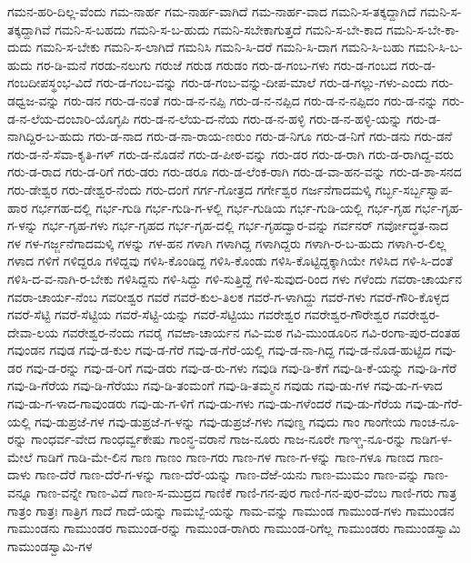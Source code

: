 ಗಮನ-ಹರಿ-ದಿಲ್ಲ-ವೆಂದು
ಗಮ-ನಾರ್ಹ
ಗಮ-ನಾರ್ಹ-ವಾಗಿದೆ
ಗಮ-ನಾರ್ಹ-ವಾದ
ಗಮನಿ-ಸ-ತಕ್ಕದ್ದಾಗಿದೆ
ಗಮನಿ-ಸ-ತಕ್ಕದ್ದಾಗಿವೆ
ಗಮನಿ-ಸ-ಬಹದು
ಗಮನಿ-ಸ-ಬ-ಹುದು
ಗಮನಿ-ಸಬೇಕಾಗುತ್ತದೆ
ಗಮನಿ-ಸ-ಬೇ-ಕಾದ
ಗಮನಿ-ಸ-ಬೇ-ಕಾ-ದುದು
ಗಮನಿ-ಸ-ಬೇಕು
ಗಮನಿ-ಸ-ಲಾಗಿದೆ
ಗಮನಿಸಿ
ಗಮನಿ-ಸಿ-ದರೆ
ಗಮನಿ-ಸಿ-ದಾಗ
ಗಮನಿ-ಸಿ-ಬಹು
ಗಮನಿ-ಸಿ-ಬ-ಹುದು
ಗರ-ಡಿ-ಮನೆ
ಗರಡು-ನಲುಗು
ಗರುಜೆ
ಗರುಡ
ಗರುಡಂ
ಗರು-ಡ-ಗಂಬ-ಗಳು
ಗರು-ಡ-ಗಂಬದ
ಗರು-ಡ-ಗಂಬದೀಪಸ್ಥಂಭ-ವಿದೆ
ಗರು-ಡ-ಗಂಬ-ವನ್ನು
ಗರು-ಡ-ಗಂಬ-ವನ್ನು-ದೀಪ-ಮಾಲೆ
ಗರು-ಡ-ಗಲ್ಲು-ಗಳು-ಎಂದು
ಗರು-ಡಧ್ವಜ-ವನ್ನು
ಗರು-ಡನ
ಗರು-ಡ-ನಂತೆ
ಗರು-ಡ-ನ-ನಪ್ಪಿ
ಗರು-ಡ-ನ-ನಪ್ಪಿದ
ಗರು-ಡ-ನ-ನಪ್ಪಿದಂ
ಗರು-ಡ-ನನ್ನು
ಗರು-ಡ-ನ-ಲೆಯ-ದಂಬಾರಿ-ಯೊಗ್ಳಪಿ
ಗರು-ಡ-ನ-ಲೆಯ-ದ-ನೆಯ
ಗರು-ಡ-ನ-ಹಳ್ಳಿ
ಗರು-ಡ-ನ-ಹಳ್ಳಿ-ಯನ್ನು
ಗರು-ಡ-ನಾಗಿದ್ದಿರ-ಬ-ಹುದು
ಗರು-ಡ-ನಾದ
ಗರು-ಡ-ನಾ-ರಾಯ-ಣರುಂ
ಗರು-ಡ-ನಿಗೂ
ಗರು-ಡ-ನಿಗೆ
ಗರು-ಡನು
ಗರು-ಡನೆ
ಗರು-ಡ-ನೆ-ಸೆವಾ-ಕೃತಿ-ಗಳ್
ಗರು-ಡ-ನೊಡನೆ
ಗರು-ಡ-ಪೀಠ-ವನ್ನು
ಗರು-ಡರ
ಗರು-ಡ-ರಾಗಿ
ಗರು-ಡ-ರಾಗಿದ್ದ-ವರು
ಗರು-ಡ-ರಾದ
ಗರು-ಡ-ರಿಗೆ
ಗರು-ಡರು
ಗರು-ಡರೂ
ಗರು-ಡ-ಲೆಂಕ-ರಾಗಿ
ಗರು-ಡ-ವಾ-ಹನ-ವನ್ನು
ಗರು-ಡ-ಶಾ-ಸನದ
ಗರು-ಡೇಶ್ವರ
ಗರು-ಡೇಶ್ವರ-ನೆಂದು
ಗರು-ದಂಗೆ
ಗರ್ಗ-ಗೋತ್ರದ
ಗರ್ಗೇಶ್ವರ
ಗರ್ಜನೆಗಾದಮಳ್ಕಿ
ಗರ್ಬ್ಭ-ಸರ್ಬ್ಬಸ್ವಾಪ-ಹಾರ
ಗರ್ಭಗಹ-ದಲ್ಲಿ
ಗರ್ಭ-ಗುಡಿ
ಗರ್ಭ-ಗುಡಿ-ಗ-ಳಲ್ಲಿ
ಗರ್ಭ-ಗುಡಿಯ
ಗರ್ಭ-ಗುಡಿ-ಯಲ್ಲಿ
ಗರ್ಭ-ಗೃಹ
ಗರ್ಭ-ಗೃಹ-ಗ-ಳನ್ನು
ಗರ್ಭ-ಗೃಹ-ಗಳು
ಗರ್ಭ-ಗೃಹದ
ಗರ್ಭ-ಗೃಹ-ದಲ್ಲಿ
ಗರ್ಭ-ಗೃಹದ್ವಾರ-ವನ್ನು
ಗರ್ವನರ್
ಗರ್ವೋದ್ಧತ-ನಾದ
ಗಳ
ಗಳ-ಗರ್ಜ್ಜನೆಗಾದಮಳ್ಕಿ
ಗಳನ್ನು
ಗಳ-ಹನ
ಗಳಾಗಿ
ಗಳಾಗಿದ್ದ
ಗಳಾಗಿದ್ದರು
ಗಳಾಗಿ-ರ-ಬ-ಹುದು
ಗಳಾಗಿ-ರ-ಲಿಲ್ಲ
ಗಳಾದ
ಗಳಿಗೆ
ಗಳಿದ್ದರೂ
ಗಳಿದ್ದವು
ಗಳಿಸಿ-ಕೊಂಡಿದ್ದ
ಗಳಿಸಿ-ಕೊಂಡು
ಗಳಿಸಿ-ಕೊಟ್ಟಿದ್ದಕ್ಕಾಗಿಯೇ
ಗಳಿಸಿದ
ಗಳಿ-ಸಿ-ದಂತೆ
ಗಳಿಸಿ-ದ-ವ-ನಾಗಿ-ರ-ಬೇಕು
ಗಳಿಸಿದ್ದನು
ಗಳಿ-ಸಿದ್ದು
ಗಳಿ-ಸುತ್ತಿದ್ದೆ
ಗಳಿ-ಸುವುದ-ರಿಂದ
ಗಳು
ಗಳೆಂದು
ಗವರಾ-ಚಾರ್ಯನ
ಗವರಾ-ಚಾರ್ಯ-ನೆಂಬ
ಗವರೀಶ್ವರ
ಗವರೆ
ಗವರೆ-ಕುಲ-ತಿಲಕ
ಗವರೆ-ಗ-ಳಾಗಿದ್ದು
ಗವರೆ-ಗಳು
ಗವರೆ-ಗೌರಿ-ಕೊಳ್ಳದ
ಗವರೆ-ಸೆಟ್ಟಿ
ಗವರೆ-ಸೆಟ್ಟಿಯ
ಗವರೆ-ಸೆಟ್ಟಿ-ಯನ್ನು
ಗವರೆ-ಸೆಟ್ಟಿಯು
ಗವರೇಶ್ವರ
ಗವರೇಶ್ವರ-ಗೌರೇಶ್ವರ
ಗವರೇಶ್ವರ-ದೇವಾ-ಲಯ
ಗವರೇಶ್ವರ-ನೆಂದು
ಗವರೈ
ಗವಱಾ-ಚಾರ್ಯನ
ಗವಿ-ಮಠ
ಗವಿ-ಮುಂಡೂರಿನ
ಗವಿ-ರಂಗಾ-ಪುರ-ದಂತಹ
ಗವುಂಡನ
ಗವುಡ
ಗವು-ಡ-ಕುಲ
ಗವು-ಡ-ಗೆರೆ
ಗವು-ಡ-ಗೆರೆ-ಯಲ್ಲಿ
ಗವು-ಡ-ನಾ-ಗಿದ್ದ
ಗವು-ಡ-ನೊಡ-ಹುಟ್ಟಿದ
ಗವು-ಡರ
ಗವು-ಡ-ರನ್ನು
ಗವು-ಡ-ರಿಗೆ
ಗವು-ಡರು
ಗವು-ಡ-ರು-ಗಳು
ಗವುಡಿ
ಗವು-ಡಿ-ಕೆಗೆ
ಗವು-ಡಿ-ಕೆ-ಯನ್ನು
ಗವು-ಡಿ-ಗೆರೆ
ಗವು-ಡಿ-ಗೆರೆಯ
ಗವು-ಡಿ-ಗೆರೆಯು
ಗವು-ಡಿ-ತಂಮಂಗೆ
ಗವು-ಡಿ-ತಮ್ಮನ
ಗವುಡು
ಗವು-ಡು-ಗಳ
ಗವು-ಡು-ಗ-ಳಾದ
ಗವು-ಡು-ಗ-ಳಾದ-ಗಾವುಂಡರು
ಗವು-ಡು-ಗ-ಳಿಗೆ
ಗವು-ಡು-ಗಳು
ಗವು-ಡು-ಗಳೆಂದರೆ
ಗವು-ಡು-ಗೆರೆಯ
ಗವು-ಡು-ಗೆರೆ-ಯಲ್ಲಿ
ಗವು-ಡುಪ್ರಜೆ-ಗಳ
ಗವು-ಡುಪ್ರಜೆ-ಗ-ಳನ್ನು
ಗವು-ಡುಪ್ರಜೆ-ಗಳು
ಗವುಣ್ಡ
ಗವುದು
ಗಾಂ
ಗಾಂಗೇಯ
ಗಾಂಚ-ನೂ-ರನ್ನು
ಗಾಂಧರ್ವ-ವೇದ
ಗಾಂಧರ್ವ್ವಕೇಷು
ಗಾಂನ್ಧ-ವರಾನೆ
ಗಾಜ-ನೂರು
ಗಾಜ-ನೂರೇ
ಗಾಞ್ಚ-ನೂ-ರನ್ನು
ಗಾಡಿಗ-ಳ-ಮೇಲೆ
ಗಾಡಿಗೆ
ಗಾಡಿ-ಮೇ-ಲಿನ
ಗಾಣ
ಗಾಣಂ
ಗಾಣ-ಗರು
ಗಾಣ-ಗಳ
ಗಾಣ-ಗ-ಳನ್ನು
ಗಾಣ-ಗಳೂ
ಗಾಣದ
ಗಾಣ-ದಾಳು
ಗಾಣ-ದೆರೆ
ಗಾಣ-ದೆರೆ-ಗ-ಳನ್ನು
ಗಾಣ-ದೆರೆ-ಯನ್ನು
ಗಾಣ-ದೆಱೆ-ಯನು
ಗಾಣ-ಮುಮಂ
ಗಾಣ-ವನ್ನು
ಗಾಣ-ವನ್ನೂ
ಗಾಣ-ವನ್ನೇ
ಗಾಣ-ವಿದೆ
ಗಾಣ-ಸ-ಮುದ್ರದ
ಗಾಣಿಕೆ
ಗಾಣಿ-ಗನ-ಪುರ
ಗಾಣಿ-ಗನ-ಪುರ-ವೆಂಬ
ಗಾಣಿ-ಗರು
ಗಾತ್ರ
ಗಾತ್ರಂ
ಗಾತ್ರಃ
ಗಾತ್ರಿಗ
ಗಾದೆ
ಗಾದೆ-ಯನ್ನು
ಗಾಮಬ್ಬೆ-ಯನ್ನು
ಗಾಮ-ವನ್ನು
ಗಾಮುಂಡ
ಗಾಮುಂಡ-ಗಳು
ಗಾಮುಂಡನ
ಗಾಮುಂಡನು
ಗಾಮುಂಡರ
ಗಾಮುಂಡ-ರನ್ನು
ಗಾಮುಂಡ-ರಾಗಿರು
ಗಾಮುಂಡ-ರಿಗೆಲ್ಲ
ಗಾಮುಂಡರು
ಗಾಮುಂಡಸ್ವಾಮಿ
ಗಾಮುಂಡಸ್ವಾಮಿ-ಗಳ
